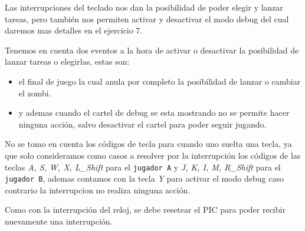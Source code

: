 	Las interrupciones del teclado nos dan la posibilidad de poder elegir y lanzar tareas, pero también nos permiten activar y desactivar el modo debug del cual daremos mas detalles en el ejercicio 7.

	Tenemos en cuenta dos eventos a la hora de activar o desactivar la posibilidad de lanzar tareas o elegirlas, estas son: 
	\begin{itemize}
		\item el final de juego la cual anula por completo la posibilidad de lanzar o cambiar el zombi.

		\item y ademas cuando el cartel de debug se esta mostrando no se permite hacer ninguna acción, salvo desactivar el cartel para poder seguir jugando.
	\end{itemize}

	No se tomo en cuenta los códigos de tecla para cuando uno suelta una tecla, ya que solo consideramos como casos a resolver por la interrupción los códigos de las teclas \textit{A, S, W, X, L\_Shift} para el \texttt{jugador A} y \textit{J, K, I, M, R\_Shift} para el \texttt{jugador B}, ademas contamos con la tecla \textit{Y} para activar el modo debug caso contrario la interrupcion no realiza ninguna acción.

	Como con la interrupción del reloj, se debe resetear el PIC para poder recibir nuevamente una interrupción.